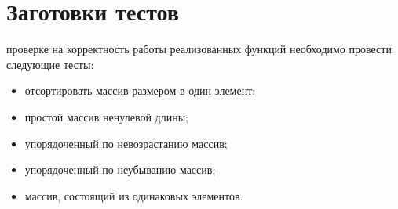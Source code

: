 \section{Заготовки тестов}
 проверке на корректность работы реализованных функций необходимо провести следующие тесты:
\begin{itemize}
	\item отсортировать массив размером в один элемент;
	\item простой массив ненулевой длины;
	\item упорядоченный по невозрастанию массив;
	\item упорядоченный по неубыванию массив;
	\item массив, состоящий из одинаковых элементов.
\end{itemize}
